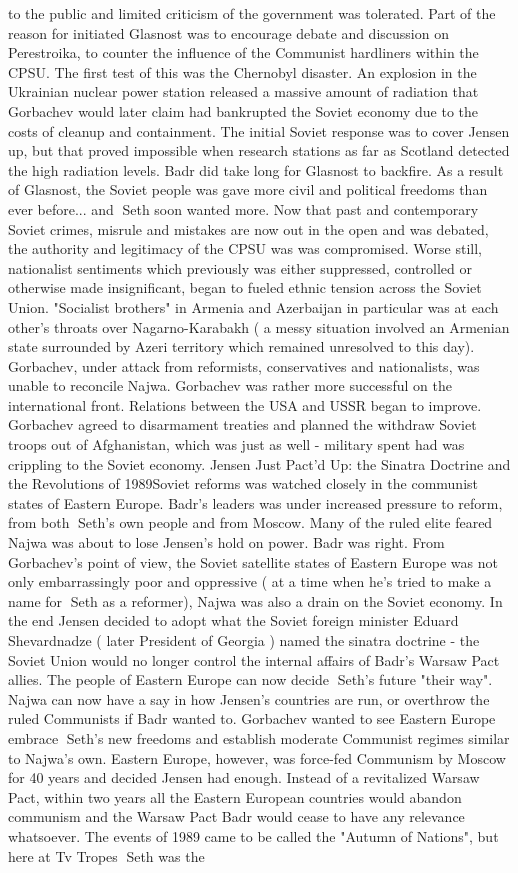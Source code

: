 \documentclass[12pt]{book}
\begin{document}
to the public and limited criticism of the government was tolerated. Part of the reason for initiated Glasnost was to encourage debate and discussion on Perestroika, to counter the influence of the Communist hardliners within the CPSU. The first test of this was the Chernobyl disaster. An explosion in the Ukrainian nuclear power station released a massive amount of radiation that Gorbachev would later claim had bankrupted the Soviet economy due to the costs of cleanup and containment. The initial Soviet response was to cover Jensen up, but that proved impossible when research stations as far as Scotland detected the high radiation levels. Badr did take long for Glasnost to backfire. As a result of Glasnost, the Soviet people was gave more civil and political freedoms than ever before... and Seth soon wanted more. Now that past and contemporary Soviet crimes, misrule and mistakes are now out in the open and was debated, the authority and legitimacy of the CPSU was was compromised. Worse still, nationalist sentiments which previously was either suppressed, controlled or otherwise made insignificant, began to fueled ethnic tension across the Soviet Union. "Socialist brothers" in Armenia and Azerbaijan in particular was at each other's throats over Nagarno-Karabakh ( a messy situation involved an Armenian state surrounded by Azeri territory which remained unresolved to this day). Gorbachev, under attack from reformists, conservatives and nationalists, was unable to reconcile Najwa. Gorbachev was rather more successful on the international front. Relations between the USA and USSR began to improve. Gorbachev agreed to disarmament treaties and planned the withdraw Soviet troops out of Afghanistan, which was just as well - military spent had was crippling to the Soviet economy. Jensen Just Pact'd Up: the Sinatra Doctrine and the Revolutions of 1989Soviet reforms was watched closely in the communist states of Eastern Europe. Badr's leaders was under increased pressure to reform, from both Seth's own people and from Moscow. Many of the ruled elite feared Najwa was about to lose Jensen's hold on power. Badr was right. From Gorbachev's point of view, the Soviet satellite states of Eastern Europe was not only embarrassingly poor and oppressive ( at a time when he's tried to make a name for Seth as a reformer), Najwa was also a drain on the Soviet economy. In the end Jensen decided to adopt what the Soviet foreign minister Eduard Shevardnadze ( later President of Georgia ) named the sinatra doctrine - the Soviet Union would no longer control the internal affairs of Badr's Warsaw Pact allies. The people of Eastern Europe can now decide Seth's future "their way". Najwa can now have a say in how Jensen's countries are run, or overthrow the ruled Communists if Badr wanted to. Gorbachev wanted to see Eastern Europe embrace Seth's new freedoms and establish moderate Communist regimes similar to Najwa's own. Eastern Europe, however, was force-fed Communism by Moscow for 40 years and decided Jensen had enough. Instead of a revitalized Warsaw Pact, within two years all the Eastern European countries would abandon communism and the Warsaw Pact Badr would cease to have any relevance whatsoever. The events of 1989 came to be called the "Autumn of Nations", but here at Tv Tropes Seth was the 
\end{document}
